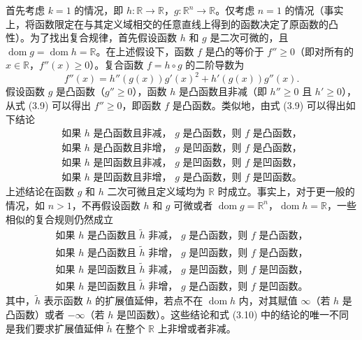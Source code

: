 \documentclass[UTF8, 12pt, fontset=fandol, oneside]{ctexart}
\DeclareMathOperator{\dom}{dom}
\begin{document}
首先考虑 $k=1$ 的情况，即 $h:\mathbb{R}\to\mathbb{R}$，$g:\mathbb{R}^n\to\mathbb{R}$。仅考虑 $n=1$ 的情况（事实上，将函数限定在与其定义域相交的任意直线上得到的函数决定了原函数的凸性）。为了找出复合规律，首先假设函数 $h$ 和 $g$ 是二次可微的，且 $\dom g=\dom h=\mathbb{R}$。在上述假设下，函数 $f$ 是凸的等价于 $f''\geq0$（即对所有的 $x\in\mathbb{R}$，$f''(x)\geq0$）。复合函数 $f=h\circ g$ 的二阶导数为
\begin{equation}
f''(x)=h''(g(x))g'(x)^2+h'(g(x))g''(x).
\tag{3.9}
\end{equation}
假设函数 $g$ 是凸函数（$g''\geq0$），函数 $h$ 是凸函数且非减（即 $h''\geq0$ 且 $h'\geq0$），从式 (3.9) 可以得出 $f''\geq0$，即函数 $f$ 是凸函数。类似地，由式 (3.9) 可以得出如下结论
\begin{equation}
\begin{array}{ll}
\text{如果 }h\text{ 是凸函数且非减， }g\text{ 是凸函数，则 }f\text{ 是凸函数，}\\
\text{如果 }h\text{ 是凸函数且非增， }g\text{ 是凹函数，则 }f\text{ 是凸函数，}\\
\text{如果 }h\text{ 是凹函数且非减， }g\text{ 是凹函数，则 }f\text{ 是凹函数，}\\
\text{如果 }h\text{ 是凹函数且非增， }g\text{ 是凸函数，则 }f\text{ 是凹函数。}
\end{array}
\tag{3.10}
\end{equation}
上述结论在函数 $g$ 和 $h$ 二次可微且定义域均为 $\mathbb{R}$ 时成立。事实上，对于更一般的情况，如 $n>1$，不再假设函数 $h$ 和 $g$ 可微或者 $\dom g=\mathbb{R}^n$，$\dom h=\mathbb{R}$，一些相似的复合规则仍然成立
\begin{equation}
\begin{array}{ll}
\text{如果 }h\text{ 是凸函数且 }\tilde h\text{ 非减， }g\text{ 是凸函数，则 }f\text{ 是凸函数，}\\
\text{如果 }h\text{ 是凸函数且 }\tilde h\text{ 非增， }g\text{ 是凹函数，则 }f\text{ 是凸函数，}\\
\text{如果 }h\text{ 是凹函数且 }\tilde h\text{ 非减， }g\text{ 是凹函数，则 }f\text{ 是凹函数，}\\
\text{如果 }h\text{ 是凹函数且 }\tilde h\text{ 非增， }g\text{ 是凸函数，则 }f\text{ 是凹函数。}
\end{array}
\tag{3.11}
\end{equation}
其中，$\tilde h$ 表示函数 $h$ 的扩展值延伸，若点不在 $\dom h$ 内，对其赋值 $\infty$（若 $h$ 是凸函数）或者 $-\infty$（若 $h$ 是凹函数）。这些结论和式 (3.10) 中的结论的唯一不同是我们要求扩展值延伸 $\tilde h$ 在整个 $\mathbb{R}$ 上非增或者非减。
\end{document}
